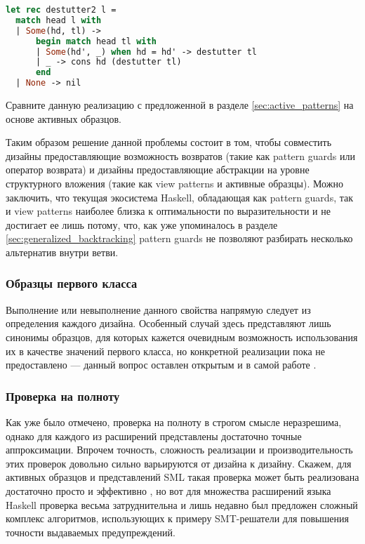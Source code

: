 \noindent
\begin{minipage}{\linewidth}
\begin{lstlisting}[language=ocaml, escapechar=@]
let rec destutter2 l = 
  match head l with
  | Some(hd, tl) ->
      begin match head tl with
      | Some(hd', _) when hd = hd' -> destutter tl
      | _ -> cons hd (destutter tl)
      end
  | None -> nil
\end{lstlisting}
\end{minipage}

Сравните данную реализацию с предложенной в разделе \ref{sec:active_patterns} на основе активных образцов.

Таким образом решение данной проблемы состоит в том, чтобы совместить дизайны предоставляющие возможность возвратов (такие как pattern guards или оператор возврата) и дизайны предоставляющие абстракции на уровне структурного вложения (такие как view patterns и активные образцы). Можно заключить, что текущая экосистема Haskell, обладающая как pattern guards, так и view patterns наиболее близка к оптимальности по выразительности и не достигает ее лишь потому, что, как уже упоминалось в разделе \ref{sec:generalized_backtracking} pattern guards не позволяют разбирать несколько альтернатив внутри ветви.

\subsubsection{Образцы первого класса}

Выполнение или невыполнение данного свойства напрямую следует из определения каждого дизайна. Особенный случай здесь представляют лишь синонимы образцов, для которых кажется очевидным возможность использования их в качестве значений первого класса, но конкретной реализации пока не предоставлено --- данный вопрос оставлен открытым и в самой работе \cite{pickering2016pattern}.

\subsubsection{Проверка на полноту}

Как уже было отмечено, проверка на полноту в строгом смысле неразрешима, однако для каждого из расширений представлены достаточно точные аппроксимации. Впрочем точность, сложность реализации и производительность этих проверок довольно сильно варьируются от дизайна к дизайну. Скажем, для активных образцов и представлений SML такая проверка может быть реализована достаточно просто и эффективно \cite{maranget2007warnings}, но вот для множества расширений языка Haskell проверка весьма затруднительна и лишь недавно \cite{peytonjones2020lower} был предложен сложный комплекс алгоритмов, использующих к примеру SMT-решатели для повышения точности выдаваемых предупреждений.  

